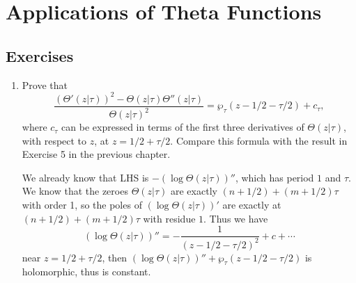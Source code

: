 \documentclass[11pt]{report}
\theoremstyle{mythm}
\let\oldendproof\endproof
\renewenvironment{proof}[1][\proofname]{%
  \oldproof[\normalfont \bfseries #1]%
}{\oldendproof}
\renewcommand*{\proofname}{Proof}
\theoremstyle{myans}
\begin{document}
\setcounter{chapter}{9}
\chapter{Applications of Theta Functions}

\section{Exercises}

\begin{enumerate}
  \item Prove that
  \[ \frac{(\Theta'(z|\tau))^2 - \Theta(z|\tau)\Theta''(z|\tau)}{\Theta(z|\tau)^2}
   = \wp_\tau(z - 1/2 - \tau / 2) + c_\tau, \]
  where $c_\tau$ can be expressed in terms of the first three derivatives of $\Theta(z|\tau)$, with respect
  to $z$, at $z = 1/2 + \tau/2$. Compare this formula with the result in Exercise 5 in the previous chapter.
  \begin{proof}
    We already know that LHS is $-(\log \Theta(z|\tau))''$, which has period $1$ and $\tau$.
    We know that the zeroes $\Theta(z|\tau)$ are exactly $(n+1/2) + (m+1/2)\tau$ with order 1,
    so the poles of $(\log \Theta(z|\tau))'$ are exactly at $(n+1/2) + (m+1/2)\tau$ with residue $1$.
    Thus we have
    \[ (\log \Theta(z|\tau))'' = - \frac 1{(z-1/2-\tau/2)^2} + c + \cdots \]
    near $z = 1/2 + \tau/2$, then $(\log \Theta(z|\tau))'' + \wp_\tau(z-1/2-\tau/2)$
    is holomorphic, thus is constant.


\end{proof}
\end{enumerate}
\end{document}
